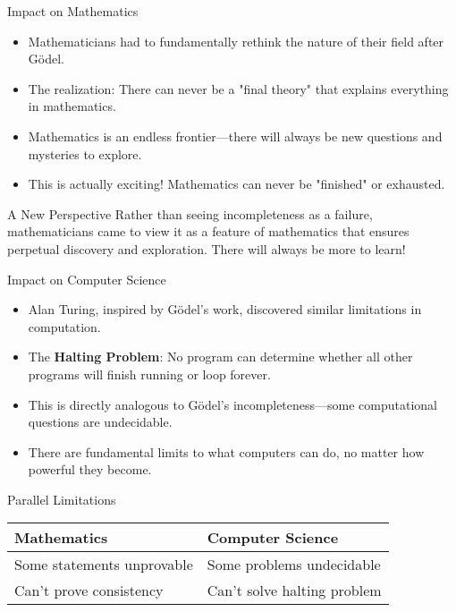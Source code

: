 \documentclass[aspectratio=169]{beamer}
\begin{document}
\begin{frame}{Impact on Mathematics}

\begin{itemize}
    \item Mathematicians had to fundamentally rethink the nature of their field after Gödel.
    \item The realization: There can never be a "final theory" that explains everything in mathematics.
    \item Mathematics is an endless frontier—there will always be new questions and mysteries to explore.
    \item This is actually exciting! Mathematics can never be "finished" or exhausted.
\end{itemize}

\begin{block}{A New Perspective}
Rather than seeing incompleteness as a failure, mathematicians came to view it as a feature of mathematics that ensures perpetual discovery and exploration. There will always be more to learn!
\end{block}

\end{frame}

\begin{frame}{Impact on Computer Science}

\begin{itemize}
    \item Alan Turing, inspired by Gödel's work, discovered similar limitations in computation.
    \item The \textbf{Halting Problem}: No program can determine whether all other programs will finish running or loop forever.
    \item This is directly analogous to Gödel's incompleteness—some computational questions are undecidable.
    \item There are fundamental limits to what computers can do, no matter how powerful they become.
\end{itemize}

\begin{block}{Parallel Limitations}
\begin{center}
\begin{tabular}{l|l}
\textbf{Mathematics} & \textbf{Computer Science} \\
\hline
Some statements unprovable & Some problems undecidable \\
Can't prove consistency & Can't solve halting problem \\
\end{tabular}
\end{center}
\end{block}

\end{frame}
\end{document}
